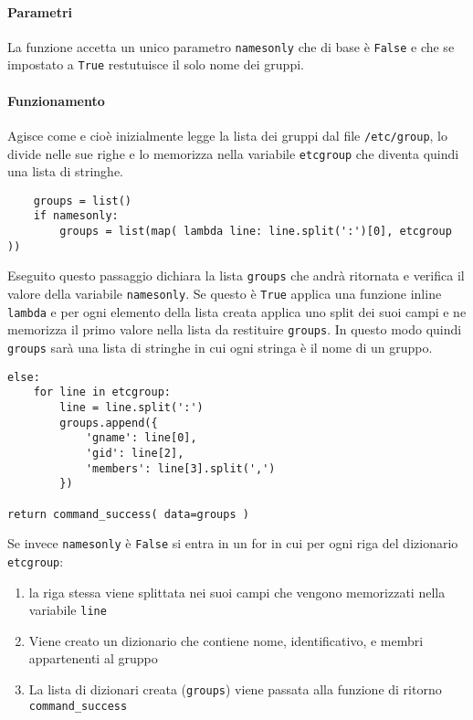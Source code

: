 \documentclass[11pt]{article}
\begin{document}
\paragraph{Parametri}
La funzione accetta un unico parametro \texttt{namesonly} che di base è \texttt{False} e che se impostato a \texttt{True}
restutuisce il solo nome dei gruppi.
\paragraph{Funzionamento}
Agisce come  e cioè inizialmente legge la lista dei gruppi dal file \texttt{/etc/group}, lo divide
nelle sue righe e lo memorizza nella variabile \texttt{etcgroup} che diventa quindi una lista di stringhe.
\begin{lstlisting}
    groups = list()
    if namesonly:
        groups = list(map( lambda line: line.split(':')[0], etcgroup ))
\end{lstlisting}
Eseguito questo passaggio dichiara la lista \texttt{groups} che andrà ritornata e verifica il valore della variabile \texttt{namesonly}.
Se questo è \texttt{True} applica una funzione inline \texttt{lambda} e per ogni elemento della lista creata
applica uno split dei suoi campi e ne memorizza il primo valore nella lista da restituire \texttt{groups}. In questo modo
quindi \texttt{groups} sarà una lista di stringhe in cui ogni stringa è il nome di un gruppo.
\begin{lstlisting}
else:
    for line in etcgroup:
        line = line.split(':')
        groups.append({
            'gname': line[0],
            'gid': line[2],
            'members': line[3].split(',')
        })

return command_success( data=groups )
\end{lstlisting}
Se invece \texttt{namesonly} è \texttt{False} si entra in un for in cui per ogni riga del dizionario \texttt{etcgroup}:
\begin{enumerate}
	\item{la riga stessa viene splittata nei suoi campi che vengono memorizzati nella variabile \texttt{line}}
	\item{Viene creato un dizionario che contiene nome, identificativo, e membri appartenenti al gruppo}
	\item{La lista di dizionari creata (\texttt{groups}) viene passata alla funzione di ritorno \texttt{command\_success}}
\end{enumerate}
\end{document}

